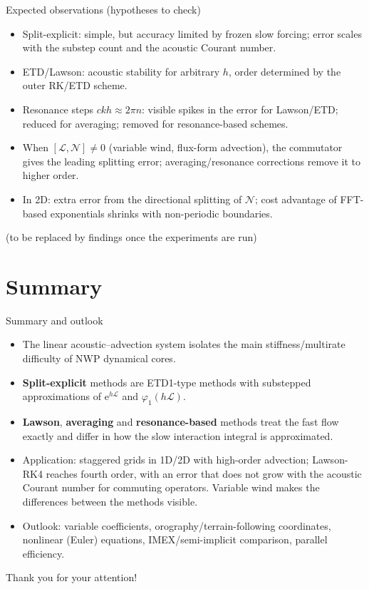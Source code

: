 \documentclass[aspectratio=169,10pt]{beamer}
\newcommand{\ee}{\mathrm{e}}
\newcommand{\LL}{\mathcal{L}}   %
\newcommand{\NN}{\mathcal{N}}   %
\newcommand{\ph}{\varphi}
\begin{document}
\begin{frame}{Expected observations (hypotheses to check)}
  \begin{itemize}
    \item Split-explicit: simple, but accuracy limited by frozen slow forcing; error scales with the substep count and the
    acoustic Courant number.
    \item ETD/Lawson: acoustic stability for arbitrary $h$, order determined by the outer RK/ETD scheme.
    \item Resonance steps $ckh\approx 2\pi n$: visible spikes in the error for Lawson/ETD; reduced for averaging;
    removed for resonance-based schemes.
    \item When $[\LL,\NN]\neq0$ (variable wind, flux-form advection), the commutator gives the leading splitting error;
    averaging/resonance corrections remove it to higher order.
    \item In 2D: extra error from the directional splitting of $\NN$; cost advantage of FFT-based exponentials shrinks with non-periodic boundaries.
  \end{itemize}
  \vspace{0.5em}
  {\footnotesize (to be replaced by findings once the experiments are run)}
\end{frame}

\section{Summary}

\begin{frame}{Summary and outlook}
  \begin{itemize}
    \item The linear acoustic--advection system isolates the main stiffness/multirate difficulty of NWP dynamical cores.
    \item \textbf{Split-explicit} methods are ETD1-type methods with substepped approximations of $\ee^{h\LL}$ and $\ph_1(h\LL)$.
    \item \textbf{Lawson}, \textbf{averaging} and \textbf{resonance-based} methods treat the fast flow exactly and differ in how the
    slow interaction integral is approximated.
    \item Application: staggered grids in 1D/2D with high-order advection; Lawson-RK4 reaches fourth order, with an error that does not grow with the acoustic Courant number
    for commuting operators. Variable wind makes the differences between the methods visible.
    \item Outlook: variable coefficients, orography/terrain-following coordinates, nonlinear (Euler) equations,
    IMEX/semi-implicit comparison, parallel efficiency.
  \end{itemize}
  \vspace{1em}
  \centering\Large Thank you for your attention!
\end{frame}
\end{document}
